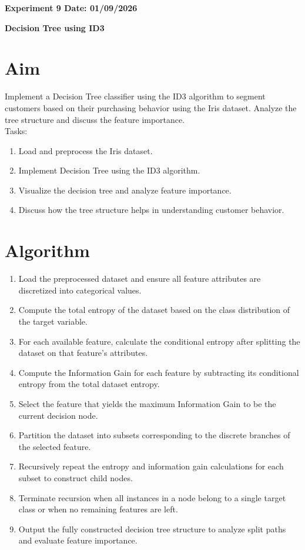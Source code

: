 \documentclass[12pt, a4paper]{report}
\begin{document}
\newpage 
\begin{center}
	\bfseries 
	Experiment 9 \hfill Date: 01/09/2026
\end{center}

\label{exp:9}
\begin{center}
	{\bfseries \Huge Decision Tree using ID3}	
\end{center}

\section*{Aim} 
Implement a Decision Tree classifier using the ID3 algorithm to segment customers based on their purchasing
behavior using the Iris dataset. Analyze the tree structure
and discuss the feature importance. \\
Tasks:
\begin{enumerate}[\quad -]
	\itemsep 0em 
	
	\item Load and preprocess the Iris dataset.
	\item Implement Decision Tree using the ID3 algorithm.
	\item Visualize the decision tree and analyze feature importance.
	\item Discuss how the tree structure helps in understanding customer behavior.
\end{enumerate}

\section*{Algorithm} 
\begin{enumerate}
	\item Load the preprocessed dataset and ensure all feature attributes are discretized into categorical values.
	\item Compute the total entropy of the dataset based on the class distribution of the target variable.
	\item For each available feature, calculate the conditional entropy after splitting the dataset on that feature's attributes.
	\item Compute the Information Gain for each feature by subtracting its conditional entropy from the total dataset entropy.
	\item Select the feature that yields the maximum Information Gain to be the current decision node.
	\item Partition the dataset into subsets corresponding to the discrete branches of the selected feature.
	\item Recursively repeat the entropy and information gain calculations for each subset to construct child nodes.
	\item Terminate recursion when all instances in a node belong to a single target class or when no remaining features are left.
	\item Output the fully constructed decision tree structure to analyze split paths and evaluate feature importance.
\end{enumerate}
\end{document}
